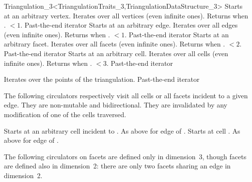 \begin{ccRefClass}{Triangulation_3<TriangulationTraits_3,TriangulationDataStructure_3>}
{Starts at an arbitrary vertex. Iterates over all vertices (even infinite
ones). Returns  when
\ccVar. $<1$.}  
\ccGlue
{}
{Past-the-end iterator}
\ccGlue
{}
{Starts at an arbitrary edge. Iterates over all edges (even infinite
ones). Returns  when \ccVar. $<1$.}
\ccGlue
{}
{Past-the-end iterator}
\ccGlue
{}
{Starts at an arbitrary facet. Iterates over all facets (even infinite
ones). Returns  when 
\ccVar. $<2$.}
\ccGlue
{}
{Past-the-end iterator}
\ccGlue
{}
{Starts at an arbitrary cell. Iterates over all cells (even infinite
ones). Returns  when 
\ccVar. $<3$.}
\ccGlue
{}
{Past-the-end iterator}

{Iterates over the points of the triangulation.}
\ccGlue
{}
{Past-the-end iterator}


The following circulators respectively visit all cells or all facets
incident to a given edge. They are non-mutable and bidirectional. They
are invalidated by any modification of one of the cells traversed. 

{Starts at an arbitrary cell incident to .
}
\ccGlue
{}
{As above for edge  of .}
\ccGlue
{}
{Starts at cell .
}
\ccGlue
{}
{As above for edge  of .}

The following circulators on facets are defined only in dimension~3,
though facets are defined also in dimension~2: there are only two
facets sharing an edge in dimension~2. 


\end{ccRefClass}
